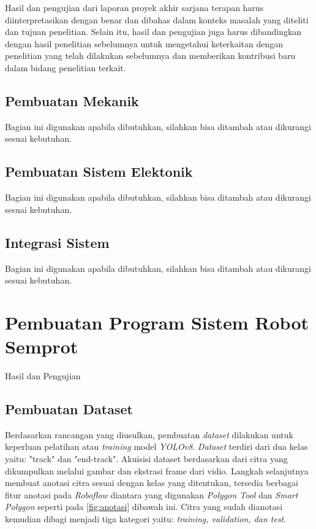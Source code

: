 Hasil dan pengujian dari laporan proyek akhir sarjana terapan harus diinterpretasikan dengan benar dan dibahas dalam konteks masalah yang diteliti dan tujuan penelitian. Selain itu, hasil dan pengujian juga harus dibandingkan dengan hasil penelitian sebelumnya untuk mengetahui keterkaitan dengan penelitian yang telah dilakukan sebelumnya dan memberikan kontribusi baru dalam bidang penelitian terkait.

\subsection{Pembuatan Mekanik}
Bagian ini digunakan apabila dibutuhkan, silahkan bisa ditambah atau dikurangi sesuai kebutuhan.

\subsection{Pembuatan Sistem Elektonik}
Bagian ini digunakan apabila dibutuhkan, silahkan bisa ditambah atau dikurangi sesuai kebutuhan.

\subsection{Integrasi Sistem}
Bagian ini digunakan apabila dibutuhkan, silahkan bisa ditambah atau dikurangi sesuai kebutuhan.

\section{Pembuatan Program Sistem Robot Semprot}
\noindent Hasil dan Pengujian

\subsection{Pembuatan Dataset}
Berdasarkan rancangan yang diusulkan, pembuatan \textit{dataset} dilakukan untuk keperluan pelatihan atau \textit{training} model \textit{YOLOv8}. \textit{Dataset} terdiri dari dua kelas yaitu: "track" dan "end-track". Akuisisi dataset berdasarkan dari citra yang dikumpulkan melalui gambar dan ekstrasi frame dari vidio. Langkah selanjutnya membuat anotasi citra sesuai dengan kelas yang ditentukan, tersedia berbagai fitur anotasi pada \textit{Roboflow} diantara yang digunakan \textit{Polygon Tool} dan \textit{Smart Polygon} seperti pada \cref{fig:anotasi} dibawah ini. Citra yang sudah dianotasi kemudian dibagi menjadi tiga kategori yaitu: \textit{training, validation, dan test}.	   

